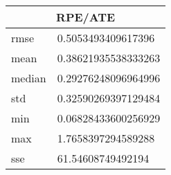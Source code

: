 \begin{table}[!ht] 
 \centering 
 \begin{tabular}{|l|l|} \hline 
 \multicolumn{2}{|c|}{RPE/ATE} \\ \hline 
 rmse & 0.5053493409617396 \\ \hline 
mean & 0.38621935538333263 \\ \hline 
median & 0.29276248096964996 \\ \hline 
std & 0.32590269397129484 \\ \hline 
min & 0.06828433600256929 \\ \hline 
max & 1.7658397294589288 \\ \hline 
sse & 61.54608749492194 \\ \hline 
\end{tabular} 
 \end{table}